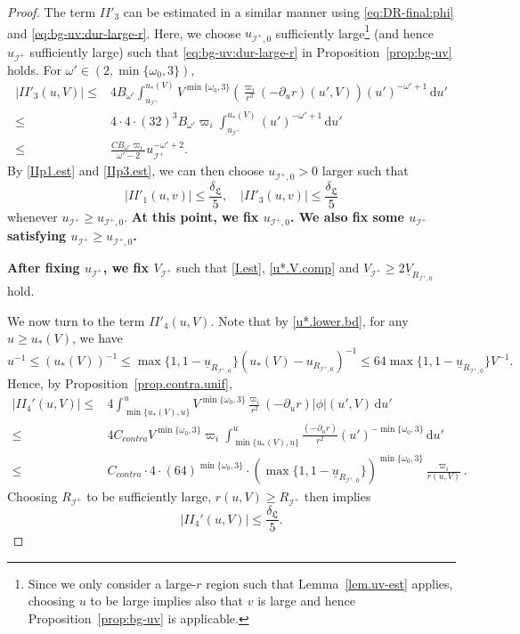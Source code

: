 \documentclass[10pt, reqno]{amsart}
\theoremstyle{definition}
\theoremstyle{remark}
\theoremstyle{conjecture}
\numberwithin{equation}{section}
\newcommand{\ud}{\mathrm{d}}
\newcommand{\rd}{\partial}
\newcommand{\0}{\emptyset}
\newcommand{\omg}{\omega}
\newcommand{\calI}{\mathcal I}
\newcommand{\f}{\frac}
\newcommand{\de}{\delta}
\newcommand{\NI}{\calI^{+}}						%
\newcommand{\ub}{\underline{u}}
\newcommand{\Vb}{\underline{V}}
\begin{document}
\begin{proof}
The term $II'_3$ can be estimated in a similar manner using \eqref{eq:DR-final:phi} and \eqref{eq:bg-uv:dur-large-r}. Here, we choose $u_{\calI^+,0}$ sufficiently large\footnote{Since we only consider a large-$r$ region such that Lemma~\ref{lem.uv-est} applies, choosing $u$ to be large implies also that $v$ is large and hence Proposition~\ref{prop:bg-uv} is applicable.} (and hence $u_{\calI^+}$ sufficiently large) such that \eqref{eq:bg-uv:dur-large-r} in Proposition~\ref{prop:bg-uv} holds. For $\omg'\in (2, \min\{\omg_0,3\})$,
\begin{equation}\label{IIp3.est}
\begin{split}
|II'_3(u,V)|\leq &4 B_{\omg'}\int_{u_{\calI^+}}^{u_*(V)} V^{\min\{\omg_0,3\}}\left(\frac{\varpi_i}{r^{3}}(-\rd_{u} r)(u',V)\right) (u')^{-\omg'+1} \, \ud u'\\
\leq & 4\cdot 4 \cdot (32)^3 B_{\omg'} \varpi_i \int_{u_{\calI^+}}^{u_*(V)} (u')^{-\omg'+1}\, \ud u'\\
\leq & \f{C B_{\omg'} \varpi_i }{\omg'-2} u_{\calI^+}^{-\omg'+2}.
\end{split}
\end{equation}
By \eqref{IIp1.est} and \eqref{IIp3.est}, we can then choose $u_{\calI^+,0}>0$ larger such that 
\begin{equation}\label{IIp.error.est}
|II'_1(u,v)|\leq \f{\de_{\mathfrak L}}{5},\quad |II'_3(u,v)|\leq \f{\de_{\mathfrak L}}{5}
\end{equation}
whenever $u_{\calI^+}\geq u_{\calI^+,0}$. \textbf{At this point, we fix $u_{\calI^+,0}$. We also fix some $u_{\calI^+}$ satisfying $u_{\calI^+}\geq u_{\calI^+,0}$.} 

\textbf{After fixing $u_{\calI^+}$, we fix $V_{\calI^+}$} such that \eqref{I.est}, \eqref{u*.V.comp} and $V_{\NI} \geq 2 \Vb_{R_{\NI,0}}$ hold.

We now turn to the term $II'_4(u,V)$. Note that by \eqref{u*.lower.bd}, for any $u\geq u_*(V)$, we have
$$u^{-1}\leq \left(u_*(V)\right)^{-1}\leq \max\{1,1-\ub_{R_{\NI,0}}\}\left(u_*(V)-u_{R_{\NI,0}}\right)^{-1}\leq 64\max\{1,1-\ub_{R_{\NI,0}}\}V^{-1}. $$
Hence, by Proposition~\ref{prop.contra.unif},
\begin{equation*}
\begin{split}
|II_4'(u,V)|\leq &4 \int_{\min\{u_*(V),u\}}^u   V^{\min\{\omg_0,3\}}\frac{\varpi_i}{r^{2}}(-\rd_{u} r)|\phi|(u',V) \, \ud u'\\
\leq & 4C_{contra} V^{\min\{\omg_0,3\}}  \varpi_i \int_{\min\{u_*(V),u\}}^u \f{(-\rd_u r)}{r^2} (u')^{-\min\{\omg_0,3\}}\,\ud u' \\
\leq & C_{contra}\cdot 4\cdot (64)^{\min\{\omg_0,3\}}\cdot \left(\max\{1,1-\ub_{R_{\NI,0}}\}\right)^{\min\{\omg_0,3\}}  \f{\varpi_i}{r(u,V)}.
\end{split}
\end{equation*}
Choosing $R_{\calI^+}$ to be sufficiently large, $r(u,V)\geq R_{\calI^+}$ then implies
\begin{equation}\label{IIp.error.4.est}
|II_4'(u,V)|\leq \f{\de_{\mathfrak L}}{5}.
\end{equation}



\end{proof}
\end{document}
